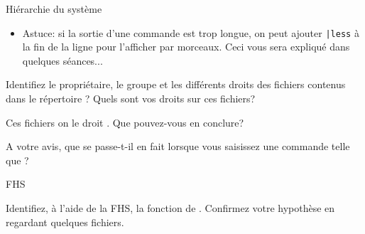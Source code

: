 \begin{exercice}
  \begin{exercicelet}{Hiérarchie du système}
    \begin{itemize}
    \item[\ddialoginformation] Astuce: si la sortie d'une commande est trop
      longue, on peut ajouter \verb/|less/ à la fin de la ligne pour
      l'afficher par morceaux. Ceci vous sera expliqué dans quelques
      séances...
    \end{itemize}
    \begin{questions}
    \item Identifiez le propriétaire, le groupe et les différents droits des
      fichiers contenus dans le répertoire ? Quels sont vos droits
      sur ces fichiers?
    \item Ces fichiers on le droit . Que pouvez-vous en conclure?
    \item A votre avis, que se passe-t-il en fait lorsque vous saisissez une
      commande telle que  ?
    \end{questions}
  \end{exercicelet}
  \begin{exercicelet}{FHS}
    \begin{questions}
    \item Identifiez, à l'aide de la FHS, la fonction de
      . Confirmez votre hypothèse en regardant quelques
      fichiers.
    \end{questions}
  \end{exercicelet}
\end{exercice}

